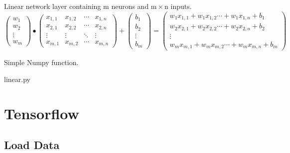 \documentclass[11pt,a4paper]{article}
\begin{document}
Linear network layer containing $\mathrm{m}$ neurons and $\mathrm{m} \times \mathrm{n}$ inputs.\\[11pt]
\[
\begin{pmatrix}
  w_{1} \\ %
  w_{2} \\ %
  \vdots \\ %
  w_{m} %
\end{pmatrix}
\bullet
\begin{pmatrix}
  x_{1,1} & x_{1,2} & \cdots & x_{1,n} \\
  x_{2,1} & x_{2,2} & \cdots & x_{2,n} \\
  \vdots & \vdots & \ddots & \vdots \\
  x_{m,1} & x_{m,2} & \cdots & x_{m,n}
\end{pmatrix}
+
\begin{pmatrix}
  b_{1} \\ %
  b_{2} \\ %
  \vdots \\ %
  b_{m} %
\end{pmatrix}
=
\begin{pmatrix}
  w_{1}x_{1,1}+w_{1}x_{1,2}\cdots + w_{1}x_{1,n}+b_{1}\\
  w_{2}x_{2,1}+w_{2}x_{2,2}\cdots + w_{2}x_{2,n}+b_{2}\\
  \vdots \\
  w_{m}x_{m,1}+w_{m}x_{m,2}\cdots + w_{m}x_{m,n}+b_{m}
\end{pmatrix}
\]

Simple Numpy function.


{linear.py}

\newpage
\section{Tensorflow}

\subsection{Load Data}
\end{document}
